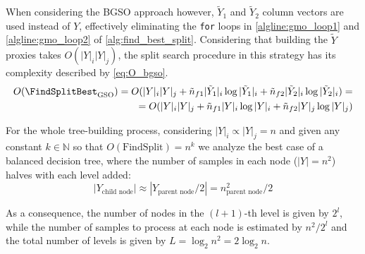 When considering the BGSO approach however, $\tilde Y_1$ and $\tilde Y_2$ column vectors are used instead of $Y$, effectively eliminating the \texttt{for} loops in \autoref{algline:gmo_loop1} and \autoref{algline:gmo_loop2} of \autoref{alg:find_best_split}. Considering that building the $\tilde Y$ proxies takes $O(|Y|_i|Y|_j)$, the split search procedure in this strategy has its complexity described by \autoref{eq:O_bgso}.
%
\begin{align}
    O(\FindSplitBest_\text{GSO})
    = O(
        |Y|_i|Y|_j
        + \tilde n_{f1} |\tilde Y_1|_i \log |\tilde Y_1|_i
        + \tilde n_{f2} |\tilde Y_2|_i \log |\tilde Y_2|_i
    )
    =\nonumber\\
    = O(
        |Y|_i|Y|_j
        + \tilde n_{f1} |Y|_i \log |Y|_i
        + \tilde n_{f2} |Y|_j \log |Y|_j
    )
    \label{eq:O_bgso}
\end{align}

For the whole tree-building process, considering $|Y|_i \propto |Y|_j = n$ and given any constant $k \in \mathbb{N}$ so that $O(\text{FindSplit})=n^k$ %
we analyze the best case of a balanced decision tree, where the number of samples in each node ($|Y| = n^2$) halves with each level added:
%
\begin{equation}
    |Y_\text{child node}| \approx |Y_\text{parent node}/2| = n_\text{parent node}^2/2
\end{equation}

As a consequence, the number of nodes in the $(l+1)$-th level is given by $2^l$, while the number of samples to process at each node is estimated by $n^2 / 2^l$ and the total number of levels is given by $L = \log_2 n^2 = 2 \log_2 n$.
%
%

